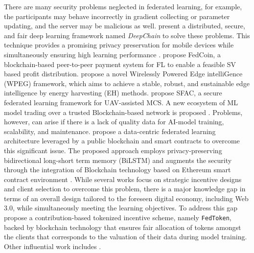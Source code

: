 \documentclass{article}
\begin{document}
There are many security problems neglected in federated learning, for example, the participants may behave incorrectly in gradient collecting or parameter updating, and the server may be malicious as well. \cite{weng_2019} present a distributed, secure, and fair deep learning framework named \textit{DeepChain} to solve these problems. This technique provides a promising privacy preservation for mobile devices while simultaneously ensuring high learning performance \cite{kang_2019}. \cite{liu_fedcoin_2020} propose FedCoin, a blockchain-based peer-to-peer payment system for FL to enable a feasible SV based profit distribution. \cite{lin_2022} propose a novel Wirelessly Powered Edge intelliGence (WPEG) framework, which aims to achieve a stable, robust, and sustainable edge intelligence by energy harvesting (EH) methods. \cite{wang_2020} propose SFAC, a secure federated learning framework for UAV-assisted MCS. A new ecosystem of ML model trading over a trusted Blockchain-based network is proposed \cite{nguyen_2021}. Problems, however, can arise if there is a lack of quality data for AI-model training, scalability, and maintenance. \cite{chaabene_2022} propose a data-centric federated learning architecture leveraged by a public blockchain and smart contracts to overcome this significant issue. The proposed approach employs privacy-preserving bidirectional long-short term memory (BiLSTM) and augments the security through the integration of Blockchain technology based on Ethereum smart contract environment \cite{rahmadika_2022}. While several works focus on strategic incentive designs and client selection to overcome this problem, there is a major knowledge gap in terms of an overall design tailored to the foreseen digital economy, including Web 3.0, while simultaneously meeting the learning objectives. To address this gap \cite{pandey_2022} propose a contribution-based tokenized incentive scheme, namely \texttt{FedToken}, backed by blockchain technology that ensures fair allocation of tokens amongst the clients that corresponds to the valuation of their data during model training. Other influential work includes \cite{lu_2020}.


\end{document}
